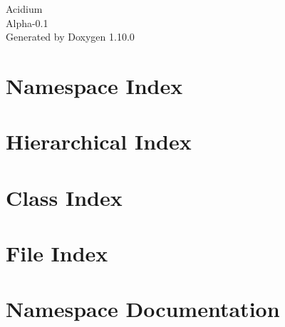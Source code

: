 \documentclass[twoside]{book}
\newcommand{\+}{\discretionary{\mbox{\scriptsize$\hookleftarrow$}}{}{}}
\newcommand{\clearemptydoublepage}{%
    \newpage{\pagestyle{empty}\cleardoublepage}%
  }
\begin{document}
  \raggedbottom
    \hypersetup{pageanchor=false,
                bookmarksnumbered=true,
                pdfencoding=unicode
               }
  \begin{titlepage}
  \vspace*{7cm}
  \begin{center}%
  {\Large Acidium}\\
  [1ex]\large Alpha-\/0.\+1 \\
  \vspace*{1cm}
  {\large Generated by Doxygen 1.10.0}\\
  \end{center}
  \end{titlepage}
  \clearemptydoublepage
  \tableofcontents
  \clearemptydoublepage
  \hypersetup{pageanchor=true}

\chapter{Namespace Index}

\chapter{Hierarchical Index}

\chapter{Class Index}

\chapter{File Index}

\chapter{Namespace Documentation}
















\end{document}
